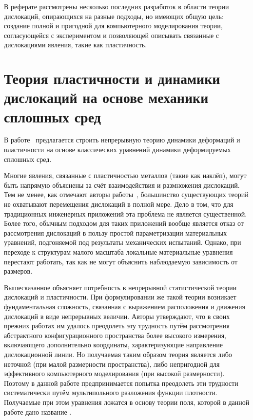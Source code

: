 \documentclass[a4paper, 14pt, titlepage]{extarticle}
\begin{document}
  В реферате рассмотрены несколько последних разработок в области теории дислокаций,
  опирающихся на разные подходы, но имеющих общую цель: создание полной и пригодной для
  компьютерного моделирования теории, согласующейся с экспериментом и позволяющей описывать
  связанные с дислокациями явления, такие как пластичность.

  \section{Теория пластичности и динамики дислокаций на основе механики сплошных сред}

  В работе~\cite{hochrainer-cdd} предлагается строить непрерывную теорию динамики деформаций и
  пластичности на основе классических уравнений динамики деформируемых сплошных сред.

  Многие явления, связанные с пластичностью металлов (такие как наклёп), могут быть напрямую
  объяснены за счёт взаимодействия и размножения дислокаций. Тем не менее, как отмечают авторы
  работы~\cite{hochrainer-cdd}, большинство существующих теорий не охватывают перемещения дислокаций в полной мере.
  Дело в том, что для традиционных инженерных приложений эта проблема не является существенной.
  Более того, обычным подходом для таких приложений вообще является отказ от рассмотрения дислокаций
  в пользу простой параметризации материальных уравнений, подгоняемой под результаты механических
  испытаний. Однако, при переходе к структурам малого масштаба локальные материальные уравнения
  перестают работать, так как не могут объяснить наблюдаемую зависимость от размеров.

  Вышесказанное объясняет потребность в непрерывной статистической теории дислокаций и пластичности. При
  формулировании же такой теории возникает фундаментальная сложность, связанная с выражением
  расположения и движения дислокаций в виде непрерывных величин. Авторы утверждают, что в своих
  прежних работах им удалось преодолеть эту трудность путём рассмотрения абстрактного
  конфигурационного пространства более высокого измерения, включающего дополнительно координаты,
  характеризующие направление дислокационной линии. Но получаемая таким образом теория является либо
  неточной (при малой размерности пространства), либо непригодной для эффективного компьютерного
  моделирования (при высокой размерности). Поэтому в данной работе предпринимается попытка
  преодолеть эти трудности систематически путём мультипольного разложения функции плотности.
  Получаемые при этом уравнения ложатся в основу теории поля, которой в данной работе дано название
  .
\end{document}
